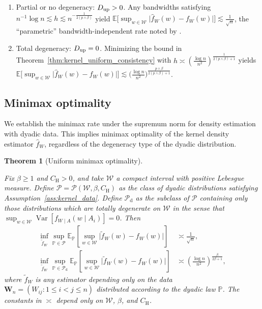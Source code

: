 \documentclass[11pt,lof]{puthesis}
\renewcommand{\P}{\ensuremath{\mathbb{P}}}
\newcommand{\E}{\ensuremath{\mathbb{E}}}
\newcommand{\rH}{\ensuremath{\mathrm{H}}}
\newcommand{\rd}{\ensuremath{\mathrm{d}}}
\newcommand{\bW}{\ensuremath{\mathbf{W}}}
\newcommand{\cW}{\ensuremath{\mathcal{W}}}
\newcommand{\cP}{\ensuremath{\mathcal{P}}}
\newcommand{\Du}{\ensuremath{D_{\textup{up}}}}
\DeclareMathOperator{\Var}{Var}
\theoremstyle{break}
\newtheorem{theorem}{Theorem}[section]
\theoremstyle{proof}
\begin{document}
%
\begin{enumerate}[label=(\roman*)]
  \item Partial or no degeneracy: $\Du > 0$.
    Any bandwidths satisfying
    $n^{-1} \log n \lesssim h \lesssim n^{-\frac{1}{2(p\wedge\beta)}}$ yield
    $\E\big[\sup_{w \in \cW}\big|\hat f_W(w)
    - f_W(w)\big| \big] \lesssim \frac{1}{\sqrt n}$, the ``parametric''
    bandwidth-independent rate noted by \citet{graham2024kernel}.

  \item Total degeneracy: $\Du = 0$.
    Minimizing the bound in Theorem~\ref{thm:kernel_uniform_consistency} with
    $h \asymp \left( \frac{\log n}{n^2} \right)^{\frac{1}{2(p\wedge\beta)+1}}$
    yields $\E\big[ \sup_{w \in \cW} \big|\hat f_W(w) - f_W(w)\big| \big]
    \lesssim
    \big(\frac{\log n}{n^2} \big)^{\frac{p\wedge\beta}{2(p\wedge\beta)+1}}$.
\end{enumerate}

\subsection{Minimax optimality}

We establish the minimax rate under the supremum norm for density estimation
with dyadic data. This implies minimax optimality of the kernel density
estimator $\hat f_W$, regardless of the degeneracy type of the dyadic
distribution.

\begin{theorem}[Uniform minimax optimality]
  \label{thm:kernel_minimax}

  Fix $\beta \geq 1$ and $C_\rH > 0$, and take $\cW$ a compact interval with
  positive Lebesgue measure. Define $\cP = \cP(\cW, \beta, C_\rH)$ as the class
  of dyadic distributions satisfying Assumption~\ref{ass:kernel_data}. Define
  $\cP_\rd$ as the subclass of $\cP$ containing only those distributions which
  are totally degenerate on $\cW$ in the sense that
  $\sup_{w \in \cW} \Var\left[f_{W \mid A}(w \mid A_i)\right] = 0$. Then
  \begin{align*}
    \inf_{\tilde f_W}
    \sup_{\P \in \cP}
    \E_\P\left[
      \sup_{w \in \cW}
      \big| \tilde f_W(w) - f_W(w) \big|
    \right]
    &\asymp
    \frac{1}{\sqrt n}, \\
    \inf_{\tilde f_W}
    \sup_{\P \in \cP_\rd}
    \E_\P\left[
      \sup_{w \in \cW}
      \big| \tilde f_W(w) - f_W(w) \big|
    \right]
    &\asymp
    \left( \frac{\log n}{n^2} \right)^{\frac{\beta}{2\beta+1}},
  \end{align*}
  where $\tilde f_W$ is any estimator depending only on the data
  $\bW_n = (W_{i j}: 1 \leq i < j \leq n)$ distributed according to the dyadic
  law $\P$. The constants in $\asymp$ depend only on
  $\cW$, $\beta$, and $C_\rH$.

\end{theorem}
\end{document}
